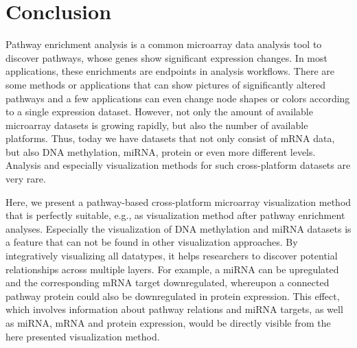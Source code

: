 \documentclass{bioinfo}
\begin{document}


\section{Conclusion}

Pathway enrichment analysis is a common microarray data analysis tool to discover pathways, whose genes show significant expression changes. In most applications, these enrichments are endpoints in analysis workflows. There are some methods or applications that can show pictures of significantly altered pathways and a few applications can even change node shapes or colors according to a single expression dataset. However, not only the amount of available microarray datasets is growing rapidly, but also the number of available platforms. Thus, today we have datasets that not only consist of mRNA data, but also DNA methylation, miRNA, protein or even more different levels. Analysis and especially visualization methods for such cross-platform datasets are very rare.

Here, we present a pathway-based cross-platform microarray visualization method that is perfectly suitable, e.g., as visualization method after pathway enrichment analyses. Especially the visualization of DNA methylation and miRNA datasets is a feature that can not be found in other visualization approaches. By integratively visualizing all datatypes, it helps researchers to discover potential relationships across multiple layers. For example, a miRNA can be upregulated and the corresponding mRNA target downregulated, whereupon a connected pathway protein could also be downregulated in protein expression. This effect, which involves information about pathway relations and miRNA targets, as well as miRNA, mRNA and protein expression, would be directly visible from the here presented visualization method.



\end{document}
